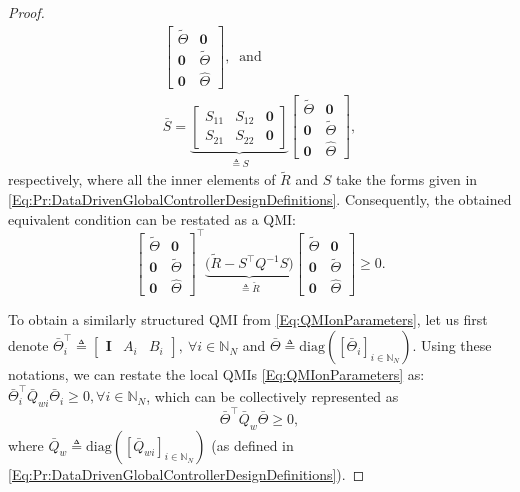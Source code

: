 \documentclass[letterpaper, 10 pt, conference]{ieeeconf}%
\newcommand{\N}{\mathbb{N}}
\newcommand{\T}{\top}
\newcommand{\I}{\mathbf{I}}
\newcommand{\0}{\mathbf{0}}
\newcommand{\diag}{\text{diag}}
\newcommand{\bm}[1]{\begin{bmatrix}#1\end{bmatrix}}
\begin{document}
\begin{proof}
\begin{gather*}
\bm{\tilde{\Theta} & \0 \\ \0 & \tilde{\Theta} \\ \0 & \hat{\Theta}},\ \mbox{ and }\\
\bar{S} = \underbrace{\bm{S_{11} & S_{12} & \0 \\ S_{21} & S_{22} & \0}}_{\triangleq S} \bm{\tilde{\Theta} & \0 \\ \0 & \tilde{\Theta} \\ \0 & \hat{\Theta}},    
\end{gather*}
respectively, where all the inner elements of $\tilde{R}$ and $S$ take the forms given in \eqref{Eq:Pr:DataDrivenGlobalControllerDesignDefinitions}. Consequently, the obtained equivalent condition can be restated as a QMI:
\begin{equation}\label{Eq:Pr:DataDrivenGlobalControllerDesignStep1}
\bm{\tilde{\Theta} & \0 \\ \0 & \tilde{\Theta} \\ \0 & \hat{\Theta}}^\T  
\underbrace{\big( \tilde{R}-S^\T Q^{-1}S \big)}_{\triangleq \check{R}} 
\bm{\tilde{\Theta} & \0 \\ \0 & \tilde{\Theta} \\ \0 & \hat{\Theta}} \geq 0.    
\end{equation}

To obtain a similarly structured QMI from \eqref{Eq:QMIonParameters}, let us first denote $\bar{\Theta}_i^\T \triangleq \bm{\I & A_i & B_i},\ \forall i\in\N_N$ and $\bar{\Theta} \triangleq \diag([\bar{\Theta}_i]_{i\in\N_N})$. Using these notations, we can restate the local QMIs \eqref{Eq:QMIonParameters} as: 
$\bar{\Theta}_i^\T \bar{Q}_{wi} \bar{\Theta}_i \geq 0, \forall i\in\N_N$, which can be collectively represented as 
$$\bar{\Theta}^\T \bar{Q}_{w} \bar{\Theta} \geq 0,$$
where $\bar{Q}_{w} \triangleq \diag([\bar{Q}_{wi}]_{i\in\N_N})$ (as defined in \eqref{Eq:Pr:DataDrivenGlobalControllerDesignDefinitions}). 


\end{proof}
\end{document}
